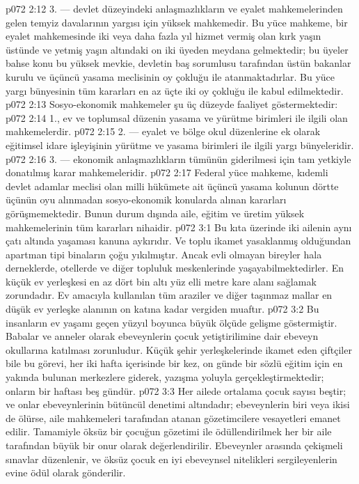 \vs p072 2:12 3.\bibnobreakspace {} --- devlet düzeyindeki anlaşmazlıkların ve eyalet mahkemelerinden gelen temyiz davalarının yargısı için yüksek mahkemedir. Bu yüce mahkeme, bir eyalet mahkemesinde iki veya daha fazla yıl hizmet vermiş olan kırk yaşın üstünde ve yetmiş yaşın altındaki on iki üyeden meydana gelmektedir; bu üyeler bahse konu bu yüksek mevkie, devletin baş sorumlusu tarafından üstün bakanlar kurulu ve üçüncü yasama meclisinin oy çokluğu ile atanmaktadırlar. Bu yüce yargı bünyesinin tüm kararları en az üçte iki oy çokluğu ile kabul edilmektedir.
\vs p072 2:13 Sosyo\hyp{}ekonomik mahkemeler şu üç düzeyde faaliyet göstermektedir:
\vs p072 2:14 1.\bibnobreakspace {}, ev ve toplumsal düzenin yasama ve yürütme birimleri ile ilgili olan mahkemelerdir.
\vs p072 2:15 2.\bibnobreakspace {} --- eyalet ve bölge okul düzenlerine ek olarak eğitimsel idare işleyişinin yürütme ve yasama birimleri ile ilgili yargı bünyeleridir.
\vs p072 2:16 3.\bibnobreakspace {} --- ekonomik anlaşmazlıkların tümünün giderilmesi için tam yetkiyle donatılmış karar mahkemeleridir.
\vs p072 2:17 Federal yüce mahkeme, kıdemli devlet adamlar meclisi olan milli hükümete ait üçüncü yasama kolunun dörtte üçünün oyu alınmadan sosyo\hyp{}ekonomik konularda alınan kararları görüşmemektedir. Bunun durum dışında aile, eğitim ve üretim yüksek mahkemelerinin tüm kararları nihaidir.
\vs p072 3:1 Bu kıta üzerinde iki ailenin aynı çatı altında yaşaması kanuna aykırıdır. Ve toplu ikamet yasaklanmış olduğundan apartman tipi binaların çoğu yıkılmıştır. Ancak evli olmayan bireyler hala derneklerde, otellerde ve diğer topluluk meskenlerinde yaşayabilmektedirler. En küçük ev yerleşkesi en az dört bin altı yüz elli metre kare alanı sağlamak zorundadır. Ev amacıyla kullanılan tüm araziler ve diğer taşınmaz mallar en düşük ev yerleşke alanının on katına kadar vergiden muaftır.
\vs p072 3:2 Bu insanların ev yaşamı geçen yüzyıl boyunca büyük ölçüde gelişme göstermiştir. Babalar ve anneler olarak ebeveynlerin çocuk yetiştirilimine dair ebeveyn okullarına katılması zorunludur. Küçük şehir yerleşkelerinde ikamet eden çiftçiler bile bu görevi, her iki hafta içerisinde bir kez, on günde bir sözlü eğitim için en yakında bulunan merkezlere giderek, yazışma yoluyla gerçekleştirmektedir; onların bir haftası beş gündür.
\vs p072 3:3 Her ailede ortalama çocuk sayısı beştir; ve onlar ebeveynlerinin bütüncül denetimi altındadır; ebeveynlerin biri veya ikisi de ölürse, aile mahkemeleri tarafından atanan gözetimcilere vesayetleri emanet edilir. Tamamiyle öksüz bir çocuğun gözetimi ile ödüllendirilmek her bir aile tarafından büyük bir onur olarak değerlendirilir. Ebeveynler arasında çekişmeli sınavlar düzenlenir, ve öksüz çocuk en iyi ebeveynsel nitelikleri sergileyenlerin evine ödül olarak gönderilir.
